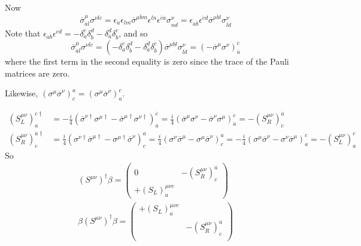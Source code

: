 \documentclass[twoside]{amsart}
\begin{document}
Now 
\[
\overline{\sigma}^{\mu}_{\dot{a} l} \sigma^{\nu l \dot{c}} = \epsilon_{\dot{a}}\epsilon_{lm} \overline{\sigma}^{\mu \dot{b} m } \epsilon^{ln} \epsilon^{\dot{c} \dot{a}} \sigma^{\nu}_{n\dot{d}} = \epsilon_{\dot{a} \dot{b} } \epsilon^{\dot{c} \dot{d}} \overline{\sigma}^{\mu \dot{b} l } \sigma^{\nu}_{l\dot{d}}
\]
Note that $\epsilon_{\dot{a} \dot{b}} \epsilon^{\dot{c} \dot{d}} = -\delta_{\dot{a}}^{\dot{c}} \delta_{\dot{b}}^{\dot{d}} -\delta_{\dot{a}}^{\dot{d}} \delta_{\dot{b}}^{\dot{c}}$, and so 
\[
\overline{\sigma}^{\mu}_{\dot{a} l} \sigma^{\nu l \dot{c}} = ( -\delta_{\dot{a}}^{\dot{c}} \delta_{\dot{b}}^{\dot{d}} -\delta_{\dot{a}}^{\dot{d}} \delta_{\dot{b}}^{\dot{c}}) \overline{\sigma}^{\mu \dot{b} l }  \sigma^{\nu}_{l \dot{d}} = (- \overline{\sigma}^{\mu} \sigma^{\nu} )^{\dot{c}}_{\dot{a}}
\]
where the first term in the second equality is zero since the trace of the Pauli matrices are zero.  

Likewise, $(\sigma^{\mu} \overline{\sigma}^{\nu})^a_c = (\sigma^{\mu} \overline{\sigma}^{\nu})^c_a$.  

\[
\begin{aligned}
  (S_L^{\mu \nu})_a^{c\dag} & = - \frac{i}{4} ( \overline{\sigma}^{\nu \dag} \sigma^{\mu \dag} - \overline{ \sigma}^{\mu \dag} \sigma^{\nu \dag} )_{\dot{a}}^{\dot{c}} = \frac{i}{4} ( \overline{\sigma}^{\mu} \sigma^{\nu} - \overline{\sigma}^{\nu} \sigma^{\mu} )_{\dot{a}}^{\dot{c}} = - (S_R^{\mu \nu})^{\dot{a}}_{\dot{c}} \\ 
  (S_R^{\mu \nu})^{\dot{a}\dag}_{\dot{c}} & = \frac{i}{4} ( \sigma^{\nu \dag} \overline{\sigma}^{\mu \dag} - \sigma^{\mu \dag} \overline{\sigma}^{\nu})^a_c = \frac{i}{4} ( \sigma^{\nu} \overline{\sigma}^{\mu} - \sigma^{\mu} \overline{\sigma}^{\nu} )^a_c = - \frac{i}{4} ( \sigma^{\mu } \overline{\sigma}^{\nu} - \sigma^{\nu } \overline{\sigma}^{\mu} )_a^c = - (S_L^{\mu \nu})_a^c
\end{aligned}
\]
So
\[
\begin{aligned}
  (S^{\mu \nu})^{\dag} \beta = \left( \begin{matrix} 0 & - (S_R^{\mu \nu})^{\dot{a}}_{\dot{c} } \\ +(S_L)^{\mu \nu c}_a & \end{matrix} \right) \\ 
  \beta (S^{\mu \nu})^{\dag} \beta = \left( \begin{matrix} +(S_L)^{\mu \nu c}_a &  \\  &  - (S_R^{\mu \nu})^{\dot{a}}_{\dot{c} } \\ \end{matrix} \right)
\end{aligned}
\]
\end{document}
